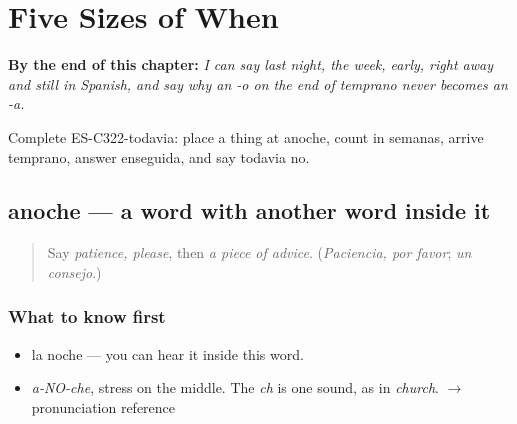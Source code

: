 
\chapter{Five Sizes of When}
\label{ch:anoche-y-todavia}

\begin{chapteropening}
\textbf{By the end of this chapter:} \emph{I can say last night, the week, early, right away and still in Spanish, and say why an -o on the end of temprano never becomes an -a.}

Complete ES-C322-todavia: place a thing at anoche, count in semanas, arrive temprano, answer enseguida, and say todavia no.
\end{chapteropening}

\section[anoche]{anoche — a word with another word inside it}

\label{lesson:ES-C322-anoche}



\begin{quote}
Say \emph{patience, please}, then \emph{a piece of advice}. (\emph{Paciencia, por favor}; \emph{un consejo}.)
\end{quote}

\subsection*{What to know first}
\begin{itemize}
\raggedright
  \item la noche — you can hear it inside this word.
\end{itemize}

\begin{sounds}
\begin{itemize}
\raggedright
  \item \emph{a-NO-che}, stress on the middle. The \emph{ch} is one sound, as in \emph{church}. $\to$ pronunciation reference
\end{itemize}
\end{sounds}

